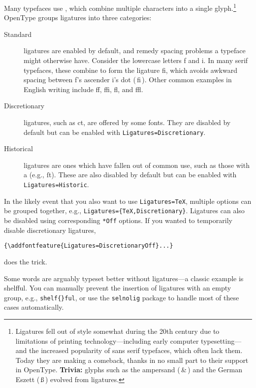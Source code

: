 Many typefaces use , which combine multiple characters
into a single glyph.\punckern\footnote{Ligatures fell out
of style somewhat during the 20{th}
century due to limitations of printing technology---including early
computer typesetting---and the increased popularity of sans serif typefaces,
which often lack them.
Today they are making a comeback,
thanks in no small part to their support in OpenType.
\textbf{Trivia:} glyphs such as the ampersand
(\,\&\,) and the German Eszett (\,ß\,) evolved
from ligatures.}
OpenType groups ligatures into three categories:
\begin{description}
\item[Standard] ligatures are enabled by default, and remedy spacing problems
    a typeface might otherwise have. Consider the lowercase letters f
    and i.
    In many serif typefaces, these combine
    to form the ligature fi, which avoids awkward spacing between f's ascender
    i's dot
    { (\,fi\,)}.
    Other common examples in English writing include ff,
    ffi, fl, and ffl.
\item[Discretionary] ligatures, such as
    {ct},
    are offered by some fonts.
    They are disabled by default
    but can be enabled with
    \verb|Ligatures=Discretionary|.
\item[Historical] ligatures are ones which have fallen out of common use,
    such as those with a  (e.g., ſt).
    These are also disabled by default
    but can be enabled with \verb|Ligatures=Historic|.
\end{description}
In the likely event that you also want to use \verb|Ligatures=TeX|,
multiple options can be grouped together, e.g.,
\verb|Ligatures={TeX,Discretionary}|.
Ligatures can also be disabled using corresponding \verb|*Off|
options. If you wanted to temporarily disable discretionary ligatures,
\begin{leftfigure}
\begin{lstlisting}
{\addfontfeature{Ligatures=DiscretionaryOff}...}
\end{lstlisting}
\end{leftfigure}
does the trick.

Some words are arguably typeset better without ligatures---a classic example
is shelfful.\punckern{}
You can manually prevent the insertion of ligatures with an empty group,
e.g., \verb|shelf{}ful|,
or use the \texttt{selnolig} package to handle most of these cases automatically.

